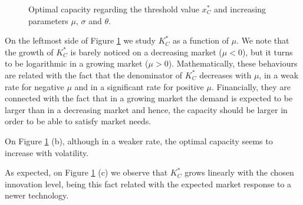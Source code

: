 \begin{figure}[!htb]
	\begin{subfigmatrix}{3}
	\end{subfigmatrix}
	\caption{Optimal capacity regarding the threshold value $x^*_C$ and increasing parameters $\mu$, $\sigma$ and $\theta$.}
	\label{fig:k1}
\end{figure}

On the leftmost side of Figure \ref{fig:k1} we study $K^*_C$ as a function of $\mu$. We note that the growth of $K^*_C$ is barely noticed on a decreasing market ($\mu<0$), but it turns to be logarithmic in a growing market ($\mu>0$). Mathematically, these behaviours are related with the fact that the denominator of $K^*_C$ decreases with $\mu$, in a weak rate for negative $\mu$ and in a significant rate for positive $\mu$. Financially, they are connected with the fact that in a growing market the demand is expected to be larger than in a decreasing market and hence, the capacity should be larger in order to be able to satisfy market needs.

On Figure \ref{fig:k1} (b), although in a weaker rate, the optimal capacity seems to increase with volatility.

As expected, on Figure \ref{fig:k1} (c) we observe that $K^*_C$ grows linearly with the chosen innovation level, being this fact related with the expected market response to a newer technology.

